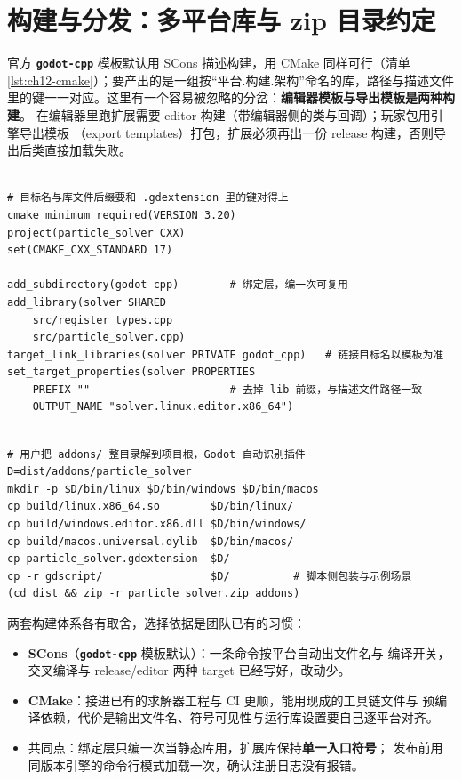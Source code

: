 \documentclass[12pt,a4paper,fontset=fandol]{ctexbook}
\newcommand{\Lib}[1]{\textbf{\texttt{#1}}}
\begin{document}
\section{构建与分发：多平台库与 zip 目录约定}
\label{sec:ch12-build}

官方 \Lib{godot-cpp} 模板默认用 SCons 描述构建，用 CMake 同样可行（清单
\ref{lst:ch12-cmake}）；要产出的是一组按``平台.构建.架构''命名的库，路径与描述文件
里的键一一对应。这里有一个容易被忽略的分岔：\textbf{编辑器模板与导出模板是两种构建}。
在编辑器里跑扩展需要 editor 构建（带编辑器侧的类与回调）；玩家包用引擎导出模板
（export templates）打包，扩展必须再出一份 release 构建，否则导出后类直接加载失败。

\begin{lstlisting}[language=CMakeLD, style=cmakestyle, caption={CMake 的最小构建形状：静态绑定层加共享扩展库}, label={lst:ch12-cmake}, framexleftmargin=12pt, framexrightmargin=12pt]

# 目标名与库文件后缀要和 .gdextension 里的键对得上
cmake_minimum_required(VERSION 3.20)
project(particle_solver CXX)
set(CMAKE_CXX_STANDARD 17)

add_subdirectory(godot-cpp)        # 绑定层，编一次可复用
add_library(solver SHARED
    src/register_types.cpp
    src/particle_solver.cpp)
target_link_libraries(solver PRIVATE godot_cpp)   # 链接目标名以模板为准
set_target_properties(solver PROPERTIES
    PREFIX ""                      # 去掉 lib 前缀，与描述文件路径一致
    OUTPUT_NAME "solver.linux.editor.x86_64")
\end{lstlisting}

\begin{lstlisting}[style=shellstyle, caption={发布包目录约定：一个 zip 里 addons 下带描述文件与多平台库}, label={lst:ch12-package}, framexleftmargin=12pt, framexrightmargin=12pt]

# 用户把 addons/ 整目录解到项目根，Godot 自动识别插件
D=dist/addons/particle_solver
mkdir -p $D/bin/linux $D/bin/windows $D/bin/macos
cp build/linux.x86_64.so        $D/bin/linux/
cp build/windows.editor.x86.dll $D/bin/windows/
cp build/macos.universal.dylib  $D/bin/macos/
cp particle_solver.gdextension  $D/
cp -r gdscript/                 $D/          # 脚本侧包装与示例场景
(cd dist && zip -r particle_solver.zip addons)
\end{lstlisting}

两套构建体系各有取舍，选择依据是团队已有的习惯：

\begin{itemize}
  \item \textbf{SCons}（\Lib{godot-cpp} 模板默认）：一条命令按平台自动出文件名与
        编译开关，交叉编译与 release/editor 两种 target 已经写好，改动少。
  \item \textbf{CMake}：接进已有的求解器工程与 CI 更顺，能用现成的工具链文件与
        预编译依赖，代价是输出文件名、符号可见性与运行库设置要自己逐平台对齐。
  \item 共同点：绑定层只编一次当静态库用，扩展库保持\textbf{单一入口符号}；
        发布前用同版本引擎的命令行模式加载一次，确认注册日志没有报错。
\end{itemize}
\end{document}
